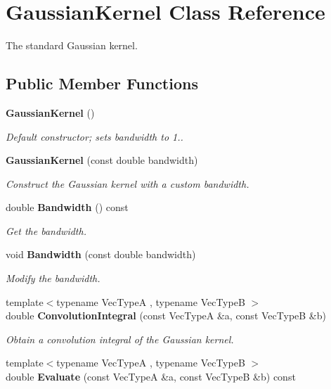 \section{Gaussian\+Kernel Class Reference}
\label{classmlpack_1_1kernel_1_1GaussianKernel}


The standard Gaussian kernel.  


\subsection*{Public Member Functions}
\begin{DoxyCompactItemize}
\item 
\textbf{ Gaussian\+Kernel} ()
\begin{DoxyCompactList}\small\item\em Default constructor; sets bandwidth to 1.. \end{DoxyCompactList}\item 
\textbf{ Gaussian\+Kernel} (const double bandwidth)
\begin{DoxyCompactList}\small\item\em Construct the Gaussian kernel with a custom bandwidth. \end{DoxyCompactList}\item 
double \textbf{ Bandwidth} () const
\begin{DoxyCompactList}\small\item\em Get the bandwidth. \end{DoxyCompactList}\item 
void \textbf{ Bandwidth} (const double bandwidth)
\begin{DoxyCompactList}\small\item\em Modify the bandwidth. \end{DoxyCompactList}\item 
{\footnotesize template$<$typename Vec\+TypeA , typename Vec\+TypeB $>$ }\\double \textbf{ Convolution\+Integral} (const Vec\+TypeA \&a, const Vec\+TypeB \&b)
\begin{DoxyCompactList}\small\item\em Obtain a convolution integral of the Gaussian kernel. \end{DoxyCompactList}\item 
{\footnotesize template$<$typename Vec\+TypeA , typename Vec\+TypeB $>$ }\\double \textbf{ Evaluate} (const Vec\+TypeA \&a, const Vec\+TypeB \&b) const

\end{DoxyCompactItemize}
